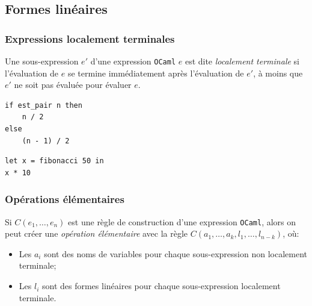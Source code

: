 \subsection{Formes linéaires}

\begin{frame}[fragile]
    \frametitle{Expressions localement terminales}

    \begin{definition}
        Une sous-expression $e'$ d'une expression \texttt{OCaml} $e$ est dite
        \textit{localement terminale} si l'évaluation de $e$ se termine
        immédiatement après l'évaluation de $e'$, à moins que $e'$ ne soit pas
        évaluée pour évaluer $e$.
    \end{definition}

    \pause

    \begin{minipage}[t]{0.5\textwidth}
        \begin{verbatim}
if est_pair n then
    n / 2
else
    (n - 1) / 2
        \end{verbatim}
    \end{minipage}%
    \begin{minipage}[t]{0.5\textwidth}
        \begin{verbatim}
let x = fibonacci 50 in
x * 10
        \end{verbatim}
    \end{minipage}

\end{frame}

\begin{frame}[t]
    \frametitle{Opérations élémentaires}
    \small
    \vspace{-0.2cm}

    \begin{definition}
        Si $C(e_1, \ldots, e_n)$ est une règle de construction d'une expression
        \texttt{OCaml}, alors on peut créer une \textit{opération élémentaire}
        avec la règle $C(a_1, \ldots, a_k, l_1, \ldots, l_{n - k})$, o\`u:

        \begin{itemize}
            \item Les $a_i$ sont des noms de variables pour chaque
                  sous-expression non localement terminale;
            \item Les $l_i$ sont des formes linéaires pour chaque
                  sous-expression localement terminale.
        \end{itemize}
    \end{definition}
\end{frame}

